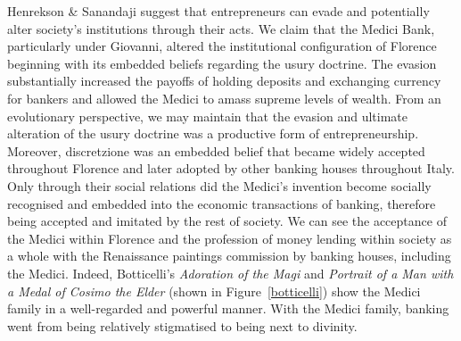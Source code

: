 Henrekson \& Sanandaji suggest that entrepreneurs can evade and potentially alter society's institutions through their acts. We claim that the Medici Bank, particularly under Giovanni, altered the institutional configuration of Florence beginning with its embedded beliefs regarding the usury doctrine. The evasion substantially increased the payoffs of holding deposits and exchanging currency for bankers and allowed the Medici to amass supreme levels of wealth. From an evolutionary perspective, we may maintain that the evasion and ultimate alteration of the usury doctrine was a productive form of entrepreneurship. Moreover, discretzione was an embedded belief that became widely accepted throughout Florence and later adopted by other banking houses throughout Italy. Only through their social relations did the Medici's invention become socially recognised and embedded into the economic transactions of banking, therefore being accepted and imitated by the rest of society. We can see the acceptance of the Medici within Florence and the profession of money lending within society as a whole with the Renaissance paintings commission by banking houses, including the Medici. Indeed, Botticelli's \emph{Adoration of the Magi} and \emph{Portrait of a Man with a Medal of Cosimo the Elder} (shown in Figure~\ref{botticelli}) show the Medici family in a well-regarded and powerful manner. With the Medici family, banking went from being relatively stigmatised to being next to divinity.

